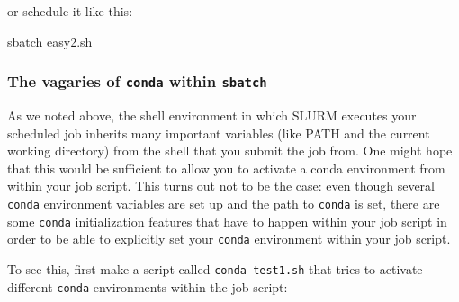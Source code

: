 \documentclass[]{krantz}
\makeatletter
\newenvironment{Shaded}{\begin{snugshade}}{\end{snugshade}}
\newcommand{\BuiltInTok}[1]{#1}
\newcommand{\CommentTok}[1]{\textcolor[rgb]{0.37,0.37,0.37}{\textit{#1}}}
\newcommand{\ExtensionTok}[1]{#1}
\newcommand{\FunctionTok}[1]{\textcolor[rgb]{0,0,0}{#1}}
\newcommand{\NormalTok}[1]{#1}
\newcommand{\StringTok}[1]{\textcolor[rgb]{0.5,0.5,0.5}{#1}}
\newcommand{\VariableTok}[1]{\textcolor[rgb]{0,0,0}{#1}}
\newenvironment{kframe}{%
\medskip{}
\setlength{\fboxsep}{.8em}
 \def\at@end@of@kframe{}%
 \ifinner\ifhmode%
  \def\at@end@of@kframe{\end{minipage}}%
  \begin{minipage}{\columnwidth}%
 \fi\fi%
 \def\FrameCommand##1{\hskip\@totalleftmargin \hskip-\fboxsep
 \colorbox{shadecolor}{##1}\hskip-\fboxsep
     \hskip-\linewidth \hskip-\@totalleftmargin \hskip\columnwidth}%
 \MakeFramed {\advance\hsize-\width
   \@totalleftmargin\z@ \linewidth\hsize
   \@setminipage}}%
 {\par\unskip\endMakeFramed%
 \at@end@of@kframe}
\renewenvironment{Shaded}{\begin{kframe}}{\end{kframe}}
\makeatother
\begin{document}
or schedule it like this:

\begin{Shaded}
\begin{Highlighting}[]
\ExtensionTok{sbatch}\NormalTok{ easy2.sh}
\end{Highlighting}
\end{Shaded}

\hypertarget{the-vagaries-of-conda-within-sbatch}{%
\subsubsection{\texorpdfstring{The vagaries of \texttt{conda} within \texttt{sbatch}}{The vagaries of conda within sbatch}}\label{the-vagaries-of-conda-within-sbatch}}

As we noted above, the shell environment in which SLURM executes
your scheduled job inherits many important variables (like PATH and
the current working directory) from the shell that you submit the job from.
One might hope that this would be sufficient to allow you to activate
a conda environment from within your job script. This turns out not to be
the case: even though several \texttt{conda} environment variables are set up
and the path to \texttt{conda} is set, there are some \texttt{conda} initialization
features that have to happen within your job script in order to be able to
explicitly set your \texttt{conda} environment within your job script.

To see this, first make a script called \texttt{conda-test1.sh} that
tries to activate different \texttt{conda} environments within the job script:

\begin{Shaded}
\end{Shaded}
\end{document}
